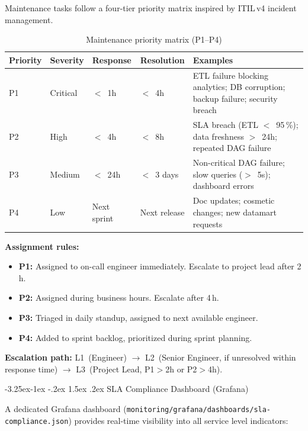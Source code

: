 \documentclass[a4paper,11pt,oneside,openany]{report}
\makeatletter
\renewcommand\subsection{\@startsection{subsection}{2}{\z@}%
  {-3.25ex\@plus -1ex \@minus -.2ex}%
  {1.5ex \@plus .2ex}%
  {\normalfont\large\bfseries\color{ntdarkgreen}}}
\makeatother
\begin{document}
Maintenance tasks follow a four-tier priority matrix inspired by
ITIL\,v4 incident management.

\begin{table}[H]
\centering
\caption{Maintenance priority matrix (P1--P4)}
\label{tab:priority-matrix}
\begin{tabularx}{\textwidth}{C{1.2cm} C{1.5cm} C{1.8cm} C{2cm} L{5cm}}
\toprule
\textbf{Priority} & \textbf{Severity} & \textbf{Response} & \textbf{Resolution} & \textbf{Examples} \\
\midrule
P1 & Critical & $<$~1h & $<$~4h & ETL failure blocking analytics; DB corruption; backup failure; security breach \\
P2 & High & $<$~4h & $<$~8h & SLA breach (ETL $<$~95\,\%); data freshness $>$~24h; repeated DAG failure \\
P3 & Medium & $<$~24h & $<$~3 days & Non-critical DAG failure; slow queries ($>$~5s); dashboard errors \\
P4 & Low & Next sprint & Next release & Doc updates; cosmetic changes; new datamart requests \\
\bottomrule
\end{tabularx}
\end{table}

\textbf{Assignment rules:}
\begin{itemize}[nosep]
  \item \textbf{P1:} Assigned to on-call engineer immediately.
        Escalate to project lead after 2\,h.
  \item \textbf{P2:} Assigned during business hours.
        Escalate after 4\,h.
  \item \textbf{P3:} Triaged in daily standup, assigned to next
        available engineer.
  \item \textbf{P4:} Added to sprint backlog, prioritized during
        sprint planning.
\end{itemize}

\textbf{Escalation path:}
L1~(Engineer) $\to$ L2~(Senior Engineer, if unresolved within response
time) $\to$ L3~(Project Lead, P1$>$2h or P2$>$4h).

\subsection{SLA Compliance Dashboard (Grafana)}

A dedicated Grafana dashboard (\texttt{monitoring/grafana/dashboards/sla-compliance.json})
provides real-time visibility into all service level indicators:
\end{document}
